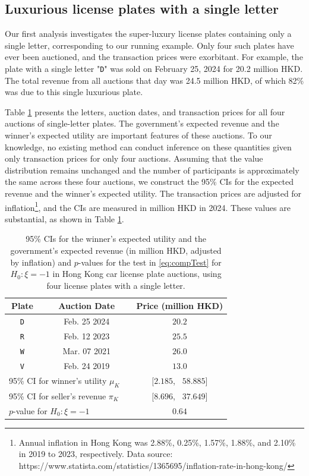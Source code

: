 \subsection{Luxurious license plates with a single letter}

Our first analysis investigates the super-luxury license plates containing only a single letter, corresponding to our running example. Only four such plates have ever been auctioned, and the transaction prices were exorbitant. For example, the plate with a single letter "\texttt{D}" was sold on February 25, 2024 for 20.2 million HKD. The total revenue from all auctions that day was 24.5 million HKD, of which 82\% was due to this single luxurious plate. 

Table \ref{tab:case1} presents the letters, auction dates, and transaction prices for all four auctions of single-letter plates. The government's expected revenue and the winner's expected utility are important features of these auctions. To our knowledge, no existing method can conduct inference on these quantities given only transaction prices for only four auctions. Assuming that the value distribution remains unchanged and the number of participants is approximately the same across these four auctions, we construct the 95\% CIs for the expected revenue and the winner's expected utility. The transaction prices are adjusted for inflation\footnote{Annual inflation in Hong Kong was 2.88\%, 0.25\%, 1.57\%, 1.88\%, and 2.10\% in 2019 to 2023, respectively. Data source: https://www.statista.com/statistics/1365695/inflation-rate-in-hong-kong/}, and the CIs are measured in million HKD in 2024. These values are substantial, as shown in Table \ref{tab:case1}. 

\begin{table}[ht]
\centering
\renewcommand{\arraystretch}{1.5}
\begin{tabular}{ccccc}
\hline\hline
Plate &  & Auction Date &  & Price (million HKD) \\ \hline
\texttt{D} &  & Feb. 25 2024 &  & $20.2$ \\ 
\texttt{R} &  & Feb. 12 2023 &  & $25.5$ \\ 
\texttt{W} &  & Mar. 07 2021 &  & $26.0$ \\ 
\texttt{V} &  & Feb. 24 2019 &  & $13.0$ \\ \hline
\multicolumn{3}{l}{95\% CI for winner's utility $\mu _{K}$} &  & $[2.185$,~ $58.885]$ \\ 
\multicolumn{3}{l}{95\% CI for seller's revenue $\pi _{K}$} &  & $[8.696$,~ $37.649]$ \\ 
\multicolumn{3}{l}{$p$-value for $H_{0}:\xi =-1$} &  & $0.64$ \\ 
\hline\hline
\end{tabular}
\caption{95\% CIs for the winner's expected utility and the government's expected revenue (in million HKD, adjusted by inflation) and $p$-values for the test in \eqref{eq:compTest} for $H_0:\xi = -1$ in Hong Kong car license plate auctions, using four license plates with a single letter.}
\label{tab:case1}
\end{table}

